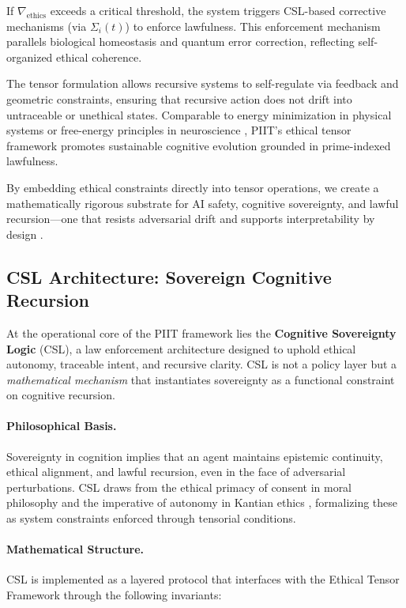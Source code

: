 \documentclass[12pt]{article}
\begin{document}
If $\nabla_{\text{ethics}}$ exceeds a critical threshold, the system triggers CSL-based corrective mechanisms (via $\Sigma_i(t)$) to enforce lawfulness. This enforcement mechanism parallels biological homeostasis and quantum error correction, reflecting self-organized ethical coherence.

The tensor formulation allows recursive systems to self-regulate via feedback and geometric constraints, ensuring that recursive action does not drift into untraceable or unethical states. Comparable to energy minimization in physical systems or free-energy principles in neuroscience \cite{friston2010free}, PIIT’s ethical tensor framework promotes sustainable cognitive evolution grounded in prime-indexed lawfulness.

By embedding ethical constraints directly into tensor operations, we create a mathematically rigorous substrate for AI safety, cognitive sovereignty, and lawful recursion—one that resists adversarial drift and supports interpretability by design \cite{gabriel2020artificial}.


\subsection{CSL Architecture: Sovereign Cognitive Recursion}

At the operational core of the PIIT framework lies the \textbf{Cognitive Sovereignty Logic} (CSL), a law enforcement architecture designed to uphold ethical autonomy, traceable intent, and recursive clarity. CSL is not a policy layer but a \textit{mathematical mechanism} that instantiates sovereignty as a functional constraint on cognitive recursion.

\paragraph{Philosophical Basis.}
Sovereignty in cognition implies that an agent maintains epistemic continuity, ethical alignment, and lawful recursion, even in the face of adversarial perturbations. CSL draws from the ethical primacy of consent in moral philosophy \cite{scanlon1998what} and the imperative of autonomy in Kantian ethics \cite{kant1997groundwork}, formalizing these as system constraints enforced through tensorial conditions.

\paragraph{Mathematical Structure.}
CSL is implemented as a layered protocol that interfaces with the Ethical Tensor Framework through the following invariants:
\end{document}
